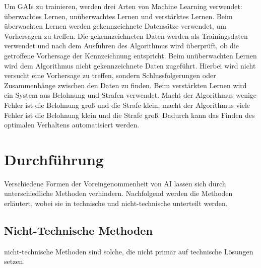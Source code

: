 \documentclass[12pt]{article}
\begin{document}
Um GAIs zu trainieren, werden drei Arten von Machine Learning verwendet: überwachtes Lernen, unüberwachtes Lernen und verstärktes Lernen. 
Beim überwachten Lernen werden gekennzeichnete Datensätze verwendet, um Vorhersagen zu treffen. Die gekennzeichneten Daten werden als Trainingsdaten verwendet und nach dem Ausführen des Algorithmus wird überprüft, ob die getroffene Vorhersage der Kennzeichnung entspricht.
Beim unüberwachten Lernen wird dem Algorithmus nicht gekennzeichnete Daten zugeführt. Hierbei wird nicht versucht eine Vorhersage zu treffen, sondern Schlussfolgerungen oder Zusammenhänge zwischen den Daten zu finden.
Beim verstärkten Lernen wird ein System aus Belohnung und Strafen verwendet. Macht der Algorithmus wenige Fehler ist die Belohnung groß und die Strafe klein, macht der Algorithmus viele Fehler ist die Belohnung klein und die Strafe groß. Dadurch kann das Finden des 
optimalen Verhaltens automatisiert werden.
\cite{serafeim}

\chapter{Durchführung}
Verschiedene Formen der Voreingenommenheit von AI lassen sich durch unterschiedliche Methoden verhindern. Nachfolgend werden die Methoden erläutert, wobei sie in technische und nicht-technische unterteilt werden.

\section{Nicht-Technische Methoden}
nicht-technische Methoden sind solche, die nicht primär auf technische Lösungen setzen.
\end{document}
